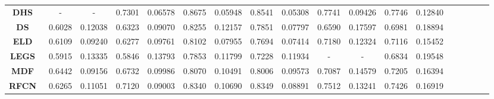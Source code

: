 \documentclass[10pt,twocolumn,letterpaper]{article}
\begin{document}
\begin{table*}
\begin{center}
\begin{tabular}{|c|c|c|c|c|c|c|c|c|c|c|c|c|c|c|c|c|c|c|c|c|c|c|c|c|||c|c|c|c|c|c|c|c|||}
\multicolumn{4}{|c|}{\textbf{DHS}~\cite{liu2016dhsnet}}
&\multicolumn{2}{|c|}{-}&\multicolumn{2}{|c|}{-}&\multicolumn{2}{|c|}{\textcolor[rgb]{0,1,0}{0.7301}}&\multicolumn{2}{|c|}{\textcolor[rgb]{1,0,0}{0.06578}}&\multicolumn{2}{|c|}{0.8675}&\multicolumn{2}{|c|}{\textcolor[rgb]{0,1,0}{0.05948}}&\multicolumn{2}{|c|}{\textcolor[rgb]{0,1,0}{0.8541}}&\multicolumn{2}{|c|}{\textcolor[rgb]{0,1,0}{0.05308}}&\multicolumn{2}{|c|}{\textcolor[rgb]{1,0,0}{0.7741}}&\multicolumn{2}{|c|}{\textcolor[rgb]{1,0,0}{0.09426}}&\multicolumn{2}{|c|}{\textcolor[rgb]{1,0,0}{0.7746}}&\multicolumn{2}{|c|}{\textcolor[rgb]{1,0,0}{0.12840}}\\
\multicolumn{4}{|c|}{\textbf{DS}~\cite{Li2016DeepSaliency}}
&\multicolumn{2}{|c|}{0.6028}&\multicolumn{2}{|c|}{0.12038}&\multicolumn{2}{|c|}{0.6323}&\multicolumn{2}{|c|}{0.09070}&\multicolumn{2}{|c|}{0.8255}&\multicolumn{2}{|c|}{0.12157}&\multicolumn{2}{|c|}{0.7851}&\multicolumn{2}{|c|}{0.07797}&\multicolumn{2}{|c|}{0.6590}&\multicolumn{2}{|c|}{0.17597}&\multicolumn{2}{|c|}{0.6981}&\multicolumn{2}{|c|}{0.18894}\\
\multicolumn{4}{|c|}{\textbf{ELD}~\cite{lee2016deep}}
&\multicolumn{2}{|c|}{0.6109}&\multicolumn{2}{|c|}{\textcolor[rgb]{0,1,0}{0.09240}}&\multicolumn{2}{|c|}{0.6277}&\multicolumn{2}{|c|}{0.09761}&\multicolumn{2}{|c|}{0.8102}&\multicolumn{2}{|c|}{0.07955}&\multicolumn{2}{|c|}{0.7694}&\multicolumn{2}{|c|}{0.07414}&\multicolumn{2}{|c|}{0.7180}&\multicolumn{2}{|c|}{0.12324}&\multicolumn{2}{|c|}{0.7116}&\multicolumn{2}{|c|}{0.15452}\\
\multicolumn{4}{|c|}{\textbf{LEGS}~\cite{wang2015deep}}
&\multicolumn{2}{|c|}{0.5915}&\multicolumn{2}{|c|}{0.13335}&\multicolumn{2}{|c|}{0.5846}&\multicolumn{2}{|c|}{0.13793}&\multicolumn{2}{|c|}{0.7853}&\multicolumn{2}{|c|}{0.11799}&\multicolumn{2}{|c|}{0.7228}&\multicolumn{2}{|c|}{0.11934}&\multicolumn{2}{|c|}{-}&\multicolumn{2}{|c|}{-}&\multicolumn{2}{|c|}{0.6834}&\multicolumn{2}{|c|}{0.19548}\\
\multicolumn{4}{|c|}{\textbf{MDF}~\cite{zhao2015saliency}}
&\multicolumn{2}{|c|}{\textcolor[rgb]{0,0,1}{0.6442}}&\multicolumn{2}{|c|}{\textcolor[rgb]{1,0,0}{0.09156}}&\multicolumn{2}{|c|}{0.6732}&\multicolumn{2}{|c|}{0.09986}&\multicolumn{2}{|c|}{0.8070}&\multicolumn{2}{|c|}{0.10491}&\multicolumn{2}{|c|}{0.8006}&\multicolumn{2}{|c|}{0.09573}&\multicolumn{2}{|c|}{0.7087}&\multicolumn{2}{|c|}{0.14579}&\multicolumn{2}{|c|}{0.7205}&\multicolumn{2}{|c|}{0.16394}\\
\multicolumn{4}{|c|}{\textbf{RFCN}~\cite{wang2016saliency}}
&\multicolumn{2}{|c|}{0.6265}&\multicolumn{2}{|c|}{0.11051}&\multicolumn{2}{|c|}{0.7120}&\multicolumn{2}{|c|}{0.09003}&\multicolumn{2}{|c|}{0.8340}&\multicolumn{2}{|c|}{0.10690}&\multicolumn{2}{|c|}{0.8349}&\multicolumn{2}{|c|}{0.08891}&\multicolumn{2}{|c|}{0.7512}&\multicolumn{2}{|c|}{0.13241}&\multicolumn{2}{|c|}{0.7426}&\multicolumn{2}{|c|}{0.16919}\\

\end{tabular}
\end{center}
\end{table*}
\end{document}
